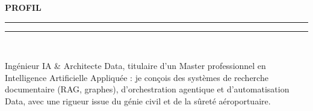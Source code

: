 \documentclass[10pt,a4paper]{article}
\newcommand{\mainSecTitle}[1]{%
  \vspace{11pt}%
  {\fontsize{11.0}{13.0}\selectfont\textbf{\color{sectionNavy}\MakeUppercase{#1}}}\\[2.5pt]%
  {\color{accentTeal}\rule{19mm}{1.2pt}\color{subtleRule}\rule{\dimexpr\linewidth-19mm\relax}{0.6pt}}\\[6pt]%
}
\begin{document}
\hspace{0.042\textwidth}%
\begin{minipage}[t]{0.648\textwidth}
  \raggedright
  \vspace{0pt}
  \mainSecTitle{PROFIL}
  \begin{tcolorbox}[enhanced, frame hidden, colback=sidebarBg,
    borderline west={2.2pt}{0pt}{accentTeal},
    left=8pt, right=7pt, top=7pt, bottom=7pt, boxsep=0pt, arc=1.5pt]
    \raggedright
    {\fontsize{10.0}{13.8}\selectfont\color{bodyText}Ingénieur IA \& Architecte Data, titulaire d’un Master professionnel en Intelligence Artificielle Appliquée : je conçois des systèmes de recherche documentaire (RAG, graphes), d’orchestration agentique et d’automatisation Data, avec une rigueur issue du génie civil et de la sûreté aéroportuaire.}
  \end{tcolorbox}


\end{minipage}
\end{document}
